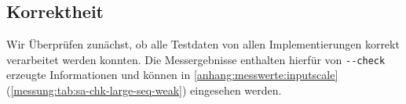 \subsection{\sa Korrektheit}

Wir Überprüfen zunächst, ob alle Testdaten von allen Implementierungen
korrekt verarbeitet werden konnten. Die Messergebnisse enthalten hierfür von \texttt{-{}-check} erzeugte Informationen und können in \cref{anhang:messwerte:inputscale} (\cref{messung:tab:sa-chk-large-seq-weak}) eingesehen werden. 
